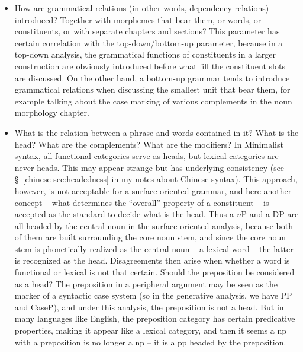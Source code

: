 \documentclass{article}
\newcommand*{\citesec}[1]{\S~{#1}}
\newcommand*{\term}[1]{\emph{#1}}
\newcommand{\chinese}{\href{../Chinese/main.pdf}{my notes about Chinese syntax}}
\begin{document}
\begin{itemize}
    \item How are grammatical relations (in other words, dependency relations) introduced? 
    Together with morphemes that bear them, or words, or constituents, or with separate chapters and sections?
    This parameter has certain correlation with the top-down/bottom-up parameter,
    because in a top-down analysis,
    the grammatical functions of constituents in a larger construction 
    are obviously introduced before what fill the constituent slots are discussed.
    On the other hand, 
    a bottom-up grammar tends to introduce grammatical relations when discussing the smallest unit that bear them,
    for example talking about the case marking of various complements in the noun morphology chapter.

    \item What is the relation between a phrase and words contained in it?
    What is the head? What are the complements? What are the modifiers?
    In Minimalist syntax, all functional categories serve as heads,
    but lexical categories are never heads.
    This may appear strange but has underlying consistency 
    (see \citesec{\ref{chinese-sec:headedness}} in \chinese).
    This approach, however, is not acceptable for a surface-oriented grammar,
    and here another concept -- what determines the ``overall'' property of a constituent -- 
    is accepted as the standard to decide what is the head. 
    Thus a \term{n}P and a DP are all headed by the central noun in the surface-oriented analysis,
    because both of them are built surrounding the core noun stem,
    and since the core noun stem is phonetically realized as the central noun -- a lexical word --
    the latter is recognized as the head.
    Disagreements then arise when whether a word is functional or lexical is not that certain.
    Should the preposition be considered as a head? 
    The preposition in a peripheral argument may be seen as the marker of a syntactic case system 
    (so in the generative analysis, we have PP and CaseP),
    and under this analysis, the preposition is not a head.
    But in many languages like English, 
    the preposition category has certain predicative properties,
    making it appear like a lexical category, 
    and then it seems a \ac{np} with a preposition is no longer a \ac{np} -- 
    it is a \ac{pp} headed by the preposition.
    

\end{itemize}
\end{document}
